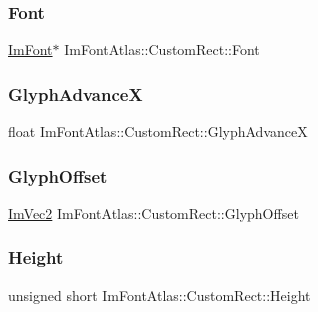 \subsubsection{\texorpdfstring{Font}{Font}}
{\footnotesize\ttfamily \hyperlink{struct_im_font}{Im\+Font}$\ast$ Im\+Font\+Atlas\+::\+Custom\+Rect\+::\+Font}

\hypertarget{struct_im_font_atlas_1_1_custom_rect_afb55b310d9816386f2eb2f11df9f11e2}{}\label{struct_im_font_atlas_1_1_custom_rect_afb55b310d9816386f2eb2f11df9f11e2} 
\subsubsection{\texorpdfstring{Glyph\+AdvanceX}{GlyphAdvanceX}}
{\footnotesize\ttfamily float Im\+Font\+Atlas\+::\+Custom\+Rect\+::\+Glyph\+AdvanceX}

\hypertarget{struct_im_font_atlas_1_1_custom_rect_a18a84c649c382fafe75eba628b5d599e}{}\label{struct_im_font_atlas_1_1_custom_rect_a18a84c649c382fafe75eba628b5d599e} 
\subsubsection{\texorpdfstring{Glyph\+Offset}{GlyphOffset}}
{\footnotesize\ttfamily \hyperlink{struct_im_vec2}{Im\+Vec2} Im\+Font\+Atlas\+::\+Custom\+Rect\+::\+Glyph\+Offset}

\hypertarget{struct_im_font_atlas_1_1_custom_rect_a7b423a44d98a6f5695941300906418e5}{}\label{struct_im_font_atlas_1_1_custom_rect_a7b423a44d98a6f5695941300906418e5} 
\subsubsection{\texorpdfstring{Height}{Height}}
{\footnotesize\ttfamily unsigned short Im\+Font\+Atlas\+::\+Custom\+Rect\+::\+Height}

\hypertarget{struct_im_font_atlas_1_1_custom_rect_a1afc9c6d72105e6695fbefa08e086387}{}\label{struct_im_font_atlas_1_1_custom_rect_a1afc9c6d72105e6695fbefa08e086387} 
